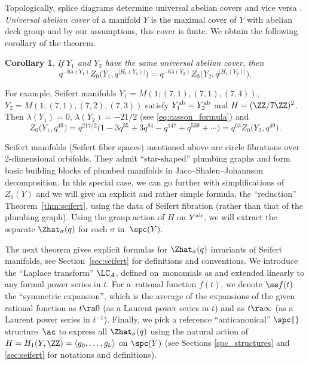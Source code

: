 \documentclass[10pt,a4paper]{amsart}
\newtheorem{Corollary}[Theorem]{Corollary}
\begin{document}
Topologically, splice diagrams determine universal abelian covers and vice versa \cite{NW05a, Pe09}. \emph{Universal abelian cover} of a manifold $Y$ is the maximal cover of $Y$ with abelian deck group and by our assumptions, this cover is finite. We obtain the following corollary of the theorem.

\begin{Corollary}
	If $Y_1$ and $Y_2$ have the same universal abelian cover, then
	\[
		q^{-6 \lambda(Y_1)} Z_0\bigl(Y_1, q^{|H_1(Y_1)|}\bigr) =
		q^{-6 \lambda(Y_2)} Z_0\bigl(Y_2, q^{|H_1(Y_2)|}\bigr).
	\]
\end{Corollary}
For example, Seifert manifolds $Y_1 = M(1;(7,1),(7,1),(7,4))$, $Y_2 = M(1;(7,1),(7,2),(7,3))$ satisfy $Y_1^{\rm ab}=Y_2^{\rm ab}$ and $H=(\ZZ/7\ZZ)^2$. Then $\lambda(Y_1)=0$, $\lambda(Y_2)=-21/2$ (see \eqref{eq:casson_formula}) and
\[
	Z_0\bigl(Y_1,q^{49}\bigr) = q^{217/2} \bigl(1 - 3 q^{35} + 3 q^{84} - q^{147} + q^{539} +\cdots\bigr) = q^{63} Z_0\bigl(Y_2,q^{49}\bigr).
\]

Seifert manifolds (Seifert fiber spaces) mentioned above are circle fibrations over 2-dimen\-sion\-al orbifolds. They admit ``star-shaped'' plumbing graphs and form basic building blocks of plumbed manifolds in Jaco--Shalen--Johannson decomposition. In this special case, we can go further with simplifications of $Z_0(Y)$ and we will give an explicit and rather simple formula, the ``reduction'' Theorem~\ref{thm:seifert}, using the data of Seifert fibration (rather than that of the plumbing graph). Using the group action of $H$ on $Y^{\rm ab}$, we will extract the separate $\Zhat_{\sigma}(q)$ for each
$\sigma$ in~$\spc(Y)$.

The next theorem gives explicit formulas for $\Zhat_\sigma(q)$ invariants of Seifert manifolds, see Section~\ref{sec:seifert} for definitions and conventions. We introduce the ``Laplace transform'' $\LC_A$, defined on~monomials as
and extended linearly to any formal power series in $t$. For a~rational function $f(t)$, we denote $\se f(t)$ the ``symmetric expansion'', which is the average of the expansions of the given rational function as $t \ra 0$ (as a Laurent power series in $t$) and as $t \ra \infty$ \big(as a Laurent power series in $t^{-1}$\big). Finally, we pick a reference ``anticanonical'' $\spc{}$ structure~$\ac$ to express all $\Zhat_\sigma(q)$ using the natural action of $H = H_1(Y,\ZZ) = \langle g_0,\dots, g_k \rangle$ on $\spc(Y)$ (see Sections \ref{spc_structures} and \ref{sec:seifert} for notations and definitions).
\end{document}
